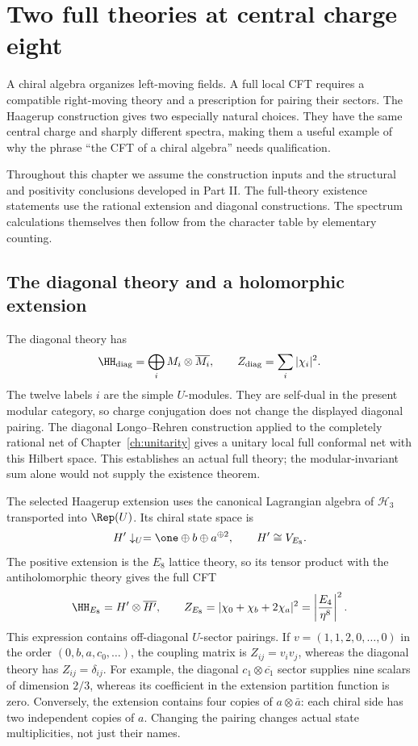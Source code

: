 \chapter{Two full theories at central charge eight}
\label{ch:full_theories}

A chiral algebra organizes left-moving fields. A full local CFT
requires a compatible right-moving theory and a prescription for
pairing their sectors. The Haagerup construction gives two especially
natural choices. They have the same central charge and sharply
different spectra, making them a useful example of why the phrase
``the CFT of a chiral algebra'' needs qualification.

Throughout this chapter we assume the construction inputs and the
structural and positivity conclusions developed in Part II.
The full-theory existence statements use the rational extension
and diagonal constructions. The spectrum calculations themselves
then follow from the character table by elementary counting.

\section{The diagonal theory and a holomorphic extension}

The diagonal theory has
\begin{equation}
 \HH_{\rm diag}=\bigoplus_i M_i\otimes\overline{M_i},
 \qquad Z_{\rm diag}=\sum_i|\chi_i|^2.
 \label{eq:full-diagonal}
\end{equation}
The twelve labels $i$ are the simple $U$-modules. They are
self-dual in the present modular category, so charge conjugation
does not change the displayed diagonal pairing. The diagonal
Longo--Rehren construction applied to the completely rational net
of Chapter~\ref{ch:unitarity} gives a unitary local full conformal
net with this Hilbert space. This establishes an actual full theory;
the modular-invariant sum alone would not supply the existence theorem.

The selected Haagerup extension uses the canonical Lagrangian
algebra of $\mathcal H_3$ transported into $\Rep(U)$. Its chiral
state space is
\[
 H'\downarrow_U=\one\oplus b\oplus a^{\oplus2},
 \qquad H'\cong V_{E_8}.
\]
The positive extension is the $E_8$ lattice theory, so its tensor
product with the antiholomorphic theory gives the full CFT
\begin{equation}
 \HH_{E_8}=H'\otimes\overline{H'},\qquad
 Z_{E_8}=|\chi_0+\chi_b+2\chi_a|^2
        =\left|\frac{E_4}{\eta^8}\right|^2.
 \label{eq:full-E8}
\end{equation}
This expression contains off-diagonal $U$-sector pairings. If
$v=(1,1,2,0,\ldots,0)$ in the order $(0,b,a,c_0,\ldots)$, the
coupling matrix is $Z_{ij}=v_iv_j$, whereas the diagonal theory
has $Z_{ij}=\delta_{ij}$.
For example, the diagonal $c_1\otimes\overline{c_1}$ sector supplies
nine scalars of dimension $2/3$, whereas its coefficient in the
extension partition function is zero. Conversely, the extension
contains four copies of $a\otimes\bar a$: each chiral side has two
independent copies of $a$. Changing the pairing changes actual state
multiplicities, not just their names.

